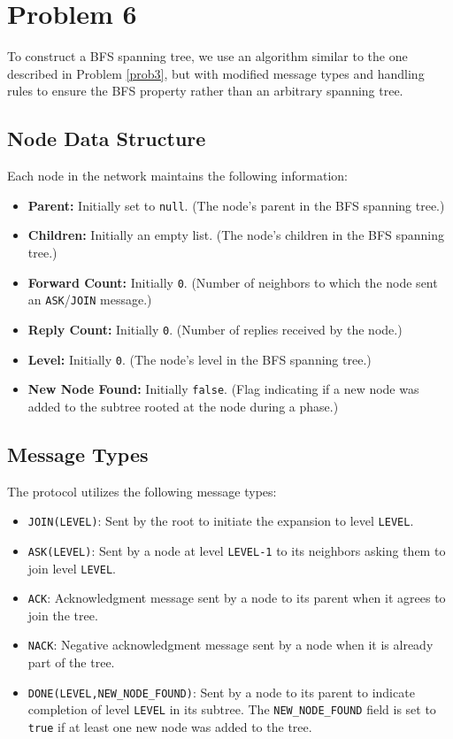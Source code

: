 \section{Problem 6}\label{prob6}

To construct a BFS spanning tree, we use an algorithm similar to the one described in Problem \ref{prob3}, but with modified message types and handling rules to ensure the BFS property rather than an arbitrary spanning tree.

\subsection{Node Data Structure}
Each node in the network maintains the following information:
\begin{itemize}
    \item \textbf{Parent:} Initially set to \texttt{null}. (The node's parent in the BFS spanning tree.)
    \item \textbf{Children:} Initially an empty list. (The node's children in the BFS spanning tree.)
    \item \textbf{Forward Count:} Initially \texttt{0}. (Number of neighbors to which the node sent an \texttt{ASK}/\texttt{JOIN} message.)
    \item \textbf{Reply Count:} Initially \texttt{0}. (Number of replies received by the node.)
    \item \textbf{Level:} Initially \texttt{0}. (The node's level in the BFS spanning tree.)
    \item \textbf{New Node Found:} Initially \texttt{false}. (Flag indicating if a new node was added to the subtree rooted at the node during a phase.)
\end{itemize}

\subsection{Message Types}
The protocol utilizes the following message types:
\begin{itemize}
    \item \texttt{JOIN(LEVEL)}: Sent by the root to initiate the expansion to level \texttt{LEVEL}.
    \item \texttt{ASK(LEVEL)}: Sent by a node at level \texttt{LEVEL-1} to its neighbors asking them to join level \texttt{LEVEL}.
    \item \texttt{ACK}: Acknowledgment message sent by a node to its parent when it agrees to join the tree.
    \item \texttt{NACK}: Negative acknowledgment message sent by a node when it is already part of the tree.
    \item \texttt{DONE(LEVEL,NEW\_NODE\_FOUND)}: Sent by a node to its parent to indicate completion of level \texttt{LEVEL} in its subtree. The \texttt{NEW\_NODE\_FOUND} field is set to \texttt{true} if at least one new node was added to the tree.
\end{itemize}

